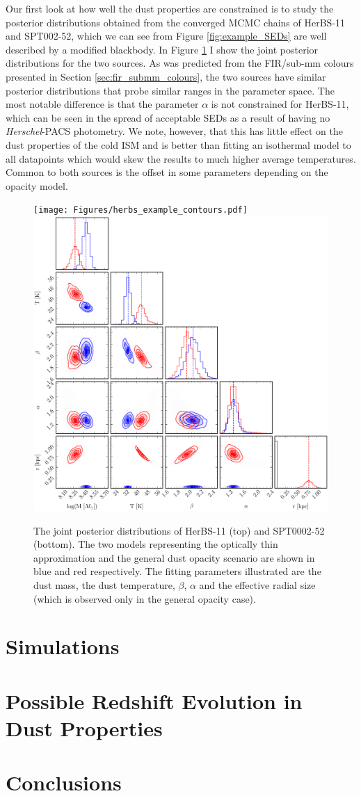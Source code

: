 Our first look at how well the dust properties are constrained is to study the posterior distributions obtained from the converged MCMC chains of HerBS-11 and SPT002-52, which we can see from Figure \ref{fig:example_SEDs} are well described by a modified blackbody. In Figure \ref{fig:example_posteriors} I show the joint posterior distributions for the two sources. As was predicted from the FIR/sub-mm colours presented in Section \ref{sec:fir_submm_colours}, the two sources have similar posterior distributions that probe similar ranges in the parameter space. The most notable difference is that the parameter $\alpha$ is not constrained for HerBS-11, which can be seen in the spread of acceptable SEDs as a result of having no \textit{Herschel}-PACS photometry. We note, however, that this has little effect on the dust properties of the cold ISM and is better than fitting an isothermal model to all datapoints which would skew the results to much higher average temperatures. Common to both sources is the offset in some parameters depending on the opacity model. 

\begin{figure}
	\centering
	\texttt{[image: Figures/herbs\_example\_contours.pdf]}
	\includegraphics[width=0.6
	\columnwidth]{Figures/spt_example_contours.pdf}
	\caption{The joint posterior distributions of HerBS-11 (top) and SPT0002-52 (bottom). The two models representing the optically thin approximation and the general dust opacity scenario are shown in blue and red respectively. The fitting parameters illustrated are the dust mass, the dust temperature, $\beta$, $\alpha$ and the effective radial size (which is observed only in the general opacity case).}
	\label{fig:example_posteriors}
\end{figure}

\section{Simulations}

\section{Possible Redshift Evolution in Dust Properties}

\section{Conclusions}

\listoftodos